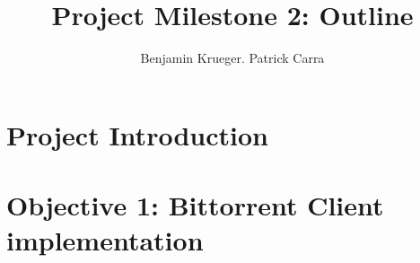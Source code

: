 \documentclass[11pt]{article}
\title{Project Milestone 2: Outline}
\author{Benjamin Krueger. Patrick Carra}
\begin{document}
\maketitle
\section{Project Introduction}
\section{Objective 1: Bittorrent Client implementation}
 
\end{document}
